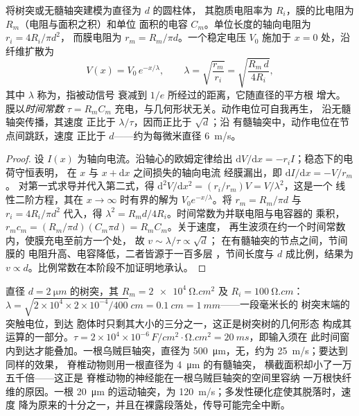 \begin{theorem}[稳态电缆方程]\label{thm:b3:nervous-systems:cable}
将树突或无髓轴突建模为直径为 $d$ 的圆柱体，
其胞质电阻率为 $R_{i}$，膜的比电阻为
$R_{m}$（电阻与面积之积）和单位
面积的电容 $C_{m}$。单位长度的轴向电阻为 $r_{i} = 4R_{i}/\pi d^{2}$，
而膜电阻为 $r_{m} = R_{m}/\pi d$。一个稳定电压
$V_{0}$ 施加于 $x = 0$ 处，沿纤维扩散为
\[
V(x) = V_{0}\,e^{-x/\lambda}, \qquad
\lambda = \sqrt{\frac{r_{m}}{r_{i}}} = \sqrt{\frac{R_{m}\,d}{4R_{i}}},
\]
其中 $\lambda$ 称为\emph{}，指被动信号
衰减到 $1/e$ 所经过的距离，它随直径的平方根
增大。膜以\emph{时间常数} $\tau =
R_{m}C_{m}$ 充电，与几何形状无关。动作电位可自我再生，
沿无髓轴突传播，其速度
正比于 $\lambda/\tau$，因而正比于 $\sqrt{d}$；沿
有髓轴突中，动作电位在节点间跳跃，速度
正比于 $d$——约为每微米直径 \qty{6}{m/s}。
\end{theorem}
\begin{proof}
设 $I(x)$ 为轴向电流。沿轴心的欧姆定律给出
$\mathrm{d}V/\mathrm{d}x = -r_{i}I$；稳态下的电荷守恒表明，
在 $x$ 与 $x + \mathrm{d}x$ 之间损失的轴向电流
经膜漏出，即 $\mathrm{d}I/\mathrm{d}x = -V/r_{m}$。
对第一式求导并代入第二式，得
$\mathrm{d}^{2}V/\mathrm{d}x^{2} = (r_{i}/r_{m})V = V/\lambda^{2}$，这是一个
线性二阶方程，其在 $x \to \infty$ 时有界的解为
$V_{0}e^{-x/\lambda}$。将 $r_{m} = R_{m}/\pi d$ 与 $r_{i} =
4R_{i}/\pi d^{2}$ 代入，得 $\lambda^{2} = R_{m}d/4R_{i}$。时间常数为并联电阻与电容器的
乘积，$r_{m}c_{m} =
(R_{m}/\pi d)(C_{m}\pi d) = R_{m}C_{m}$。关于速度，
再生波须在约一个时间常数内，使膜充电至前方一个处，
故 $v \sim \lambda/\tau \propto \sqrt{d}$；
在有髓轴突的节点之间，节间膜的
电阻升高、电容降低，二者皆源于一百多层
，节间长度与 $d$ 成比例，结果为
$v \propto d$。比例常数在本阶段不加证明地承认。
\end{proof}

\begin{example}[一个树突与两根轴突的数值]\label{ex:b3:nervous-systems:numbers}
直径 $d = \qty{2}{\micro m}$ 的树突，其 $R_{m} = \qty{2e4}{\ohm.cm^2}$
及 $R_{i} = \qty{100}{\ohm.cm}$：$\lambda = \sqrt{2\times 10^{4}\times
2\times 10^{-4}/400}\ \unit{cm} = \qty{0.1}{cm} = \qty{1}{mm}$——一段毫米长的
树突末端的突触电位，到达
胞体时只剩其大小的三分之一，这正是树突树的几何形态
构成其运算的一部分。$\tau = 2\times 10^{4}\times
10^{-6}\,\unit{F/cm^2}\cdot\unit{\ohm.cm^2} = \qty{20}{ms}$，即输入须在
此时间窗内到达才能叠加。一根乌贼巨轴突，直径为
\qty{500}{\micro m}，无，约为 \qty{25}{m/s}；要达到同样的效果，
脊椎动物则用一根直径为 \qty{4}{\micro m} 的有髓轴突，
横截面积却小了一万五千倍——这正是
脊椎动物的神经能在一根乌贼巨轴突的空间里容纳
一万根快纤维的原因。一根 \qty{20}{\micro m} 的运动轴突，为
\qty{120}{m/s}；多发性硬化症使其脱落时，速度
降为原来的十分之一，并且在裸露段落处，传导可能完全中断。
\end{example}


